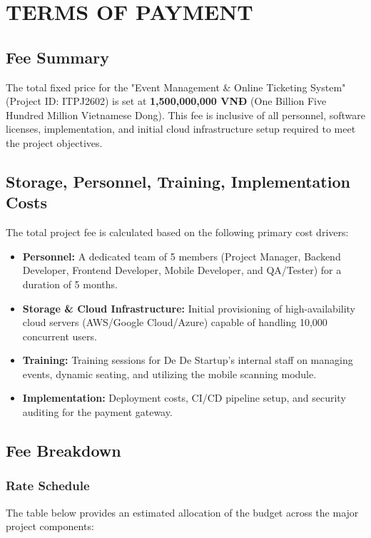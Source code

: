 \chapter{TERMS OF PAYMENT}

\section{Fee Summary}
The total fixed price for the "Event Management \& Online Ticketing System" (Project ID: ITPJ2602) is set at \textbf{1,500,000,000 VNĐ} (One Billion Five Hundred Million Vietnamese Dong). This fee is inclusive of all personnel, software licenses, implementation, and initial cloud infrastructure setup required to meet the project objectives.

\section{Storage, Personnel, Training, Implementation Costs}
The total project fee is calculated based on the following primary cost drivers:
\begin{itemize}
    \item \textbf{Personnel:} A dedicated team of 5 members (Project Manager, Backend Developer, Frontend Developer, Mobile Developer, and QA/Tester) for a duration of 5 months.
    \item \textbf{Storage \& Cloud Infrastructure:} Initial provisioning of high-availability cloud servers (AWS/Google Cloud/Azure) capable of handling 10,000 concurrent users.
    \item \textbf{Training:} Training sessions for De De Startup’s internal staff on managing events, dynamic seating, and utilizing the mobile scanning module.
    \item \textbf{Implementation:} Deployment costs, CI/CD pipeline setup, and security auditing for the payment gateway.
\end{itemize}

\section{Fee Breakdown}

\subsection{Rate Schedule}
The table below provides an estimated allocation of the budget across the major project components:

